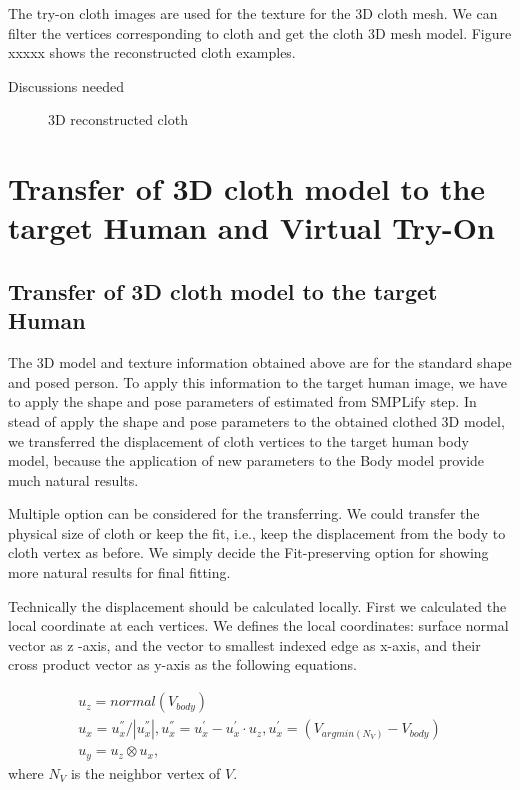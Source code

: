 \documentclass[runningheads]{llncs}
\begin{document}
The try-on cloth images are used for the texture for the 3D cloth mesh. We can filter the vertices corresponding to cloth and get the cloth 3D mesh model. Figure xxxxx shows the reconstructed cloth examples. 


Discussions needed


\begin{figure}
\centering
\caption{3D reconstructed cloth}
\label{fig:3DreconstructedCloth}
\end{figure}



\section{Transfer of 3D cloth model to the target Human and Virtual Try-On } 


\subsection{Transfer of 3D cloth model to the target Human} 

The 3D model and texture information obtained above are for the standard shape and posed person. To apply this information to the target human image, we have to apply the shape and pose parameters of estimated from SMPLify\cite{Bogo2016SMPLify} step.  In stead of apply the shape and pose parameters to the obtained clothed 3D model, we transferred the displacement of cloth vertices to the target human body model, because the application of new parameters to the Body model provide much natural results.      

Multiple option can be considered for the transferring. We could transfer the physical size of cloth or keep the fit, i.e., keep the displacement from the body to cloth vertex as before.  We simply decide the Fit-preserving option for showing more natural results for final fitting.  

Technically the displacement should be calculated locally. First we calculated the local coordinate at each vertices. We defines the local coordinates: surface normal vector as z -axis, and the vector to smallest indexed edge as x-axis, and their cross product vector as y-axis as the following equations.
 

\begin{align}
 u_{z} =  normal(V_{body})  \\
 u_{x} = u^{''}_{x}/ |u^{''}_{x} |, 
 u^{''}_{x} = u^{'}_{x} - u^{'}_{x} \cdot u_{z}, 
 u^{'}_{x} = (V_{argmin(N_V) } - V_{body}) \\
 u_{y}  =  u_z \otimes u_x,
\end{align} 
 where $N_V$ is the neighbor vertex of $V$.
 
\end{document}
